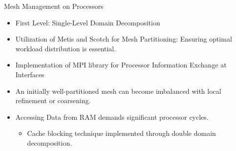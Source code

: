 \documentclass[10pt]{beamer}
\begin{document}
\begin{frame}{Mesh Management on Processors}
\begin{itemize}
\item[\large\ding{113}] {\color{um6pcolor}First Level}: Single-Level Domain Decomposition
\item[\large\ding{113}] Utilization of {\color{um6pcolor}Metis} and {\color{um6pcolor}Scotch} for Mesh Partitioning: Ensuring optimal workload distribution is essential.
\item[\large\ding{113}] Implementation of {\color{um6pcolor}MPI library} for Processor Information Exchange at Interfaces
\begin{center}
\end{center}
\item[\large\ding{113}] An initially well-partitioned mesh can become imbalanced with local refinement or coarsening.
\item[\large\ding{113}] Accessing Data from RAM demands significant processor cycles.
\begin{itemize}
\item[\large\ding{52}] Cache blocking technique implemented through double domain decomposition.
\end{itemize} 
\end{itemize} 
\end{frame}
\end{document}
